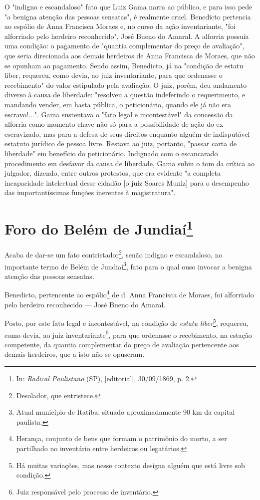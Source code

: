 {\small\noindent
O "indigno e escandaloso" fato que Luiz Gama narra ao público, e
para isso pede "a benigna atenção das pessoas sensatas", é realmente
cruel. Benedicto pertencia ao espólio de Anna Francisca Moraes e, no
curso da ação inventariante, "foi alforriado pelo herdeiro reconhecido",
José Bueno do Amaral. A alforria possuía uma condição: o pagamento de
"quantia complementar do preço de avaliação", que seria direcionada aos
demais herdeiros de Anna Francisca de Moraes, que não se opunham ao
pagamento. Sendo assim, Benedicto, já na "condição de estatu liber,
requereu, como devia, ao juiz inventariante, para que ordenasse o
recebimento" do valor estipulado pela avaliação. O juiz, porém, deu
andamento diverso à causa de liberdade: "resolveu a questão indeferindo
o requerimento, e mandando vender, em hasta pública, o peticionário,
quando ele já não era escravo!...". Gama sustentava o "fato legal e
incontestável" da concessão da alforria como momento-chave não só para a
possibilidade de ação do ex-escravizado, mas para a defesa de seus
direitos enquanto alguém de indisputável estatuto jurídico de pessoa
livre. Restava ao juiz, portanto, "passar carta de liberdade" em
benefício do peticionário. Indignado com o escancarado procedimento em
desfavor da causa de liberdade, Gama subiu o tom da crítica ao julgador,
dizendo, entre outros protestos, que era evidente "a completa
incapacidade intelectual desse cidadão {[}o juiz Soares Muniz{]} para o
desempenho das importantíssimas funções inerentes à magistratura".}

\chapter{Foro do Belém de Jundiaí\footnote[*]{In: \emph{Radical
  Paulistano} (SP), {[}editorial{]}, 30/09/1869, p. 2.}}


Acaba de dar-se um fato contristador\footnote{Desolador, que
  entristece.}, senão indigno e escandaloso, no importante termo de
Belém de Jundiaí\footnote{Atual município de Itatiba, situado
  aproximadamente 90 km da capital paulista.}, fato para o qual ouso
invocar a benigna atenção das pessoas sensatas.

Benedicto, pertencente ao espólio\footnote{Herança, conjunto de bens
  que formam o patrimônio do morto, a ser partilhado no inventário entre
  herdeiros ou legatários.} de d. Anna Francisca de Moraes, foi
alforriado pelo herdeiro reconhecido --- José Bueno do Amaral.

Posto, por este fato legal e incontestável, na condição de \emph{estatu
liber}\footnote{Há muitas variações, mas nesse contexto designa alguém
  que está livre sob condição.}, requereu, como devia, ao juiz
inventariante\footnote{Juiz responsável pelo processo de inventário.},
para que ordenasse o recebimento, na estação competente, da quantia
complementar do preço de avaliação pertencente aos demais herdeiros, que
a isto não se opuseram.

